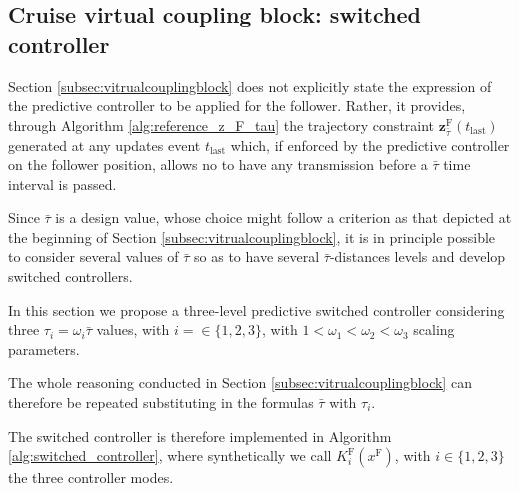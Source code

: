 \documentclass[letterpaper, 10 pt, conference]{ieeeconf}
\theoremstyle{definition}
\theoremstyle{nopoint}
\begin{document}
\subsection{Cruise virtual coupling block: switched controller}
 \label{subsec:switchedvitrualcouplingblock}  

Section \ref{subsec:vitrualcouplingblock} does not explicitly state the expression of the predictive controller to be applied for the follower. Rather, it provides, through  Algorithm \ref{alg:reference_z_F_tau} the trajectory constraint $\mathbf{z}_{\bar{\tau}}^\mathrm{F}(t_{\mathrm{last}})$ generated at any updates event $t_{\mathrm{last}}$ which, if enforced by the predictive controller on the follower position, allows no to have any transmission before a $\bar{\tau}$ time interval is passed. 

Since $\bar{\tau}$ is a design value, whose choice might follow a criterion as that depicted at the beginning of Section \ref{subsec:vitrualcouplingblock}, it is in principle possible to consider several values of $\bar{\tau}$ so as to have several $\bar{\tau}$-distances levels and develop switched controllers. 

In this section we propose a three-level predictive switched controller considering three $\tau_i=\omega_i \bar{\tau}$ values, with $i=\in \{1,2,3\}$, with $1<\omega_1 < \omega_2< \omega_3$ scaling parameters. 

The whole reasoning conducted in Section \ref{subsec:vitrualcouplingblock} can therefore be repeated substituting in the formulas $\bar{\tau}$ with $\tau_i$. 

The switched controller is therefore implemented in Algorithm \ref{alg:switched_controller}, where synthetically we call $K^{\mathrm{F}}_i(x^{\mathrm{F}})$, with $i\in \{1,2,3\}$ the three controller modes.
\end{document}
